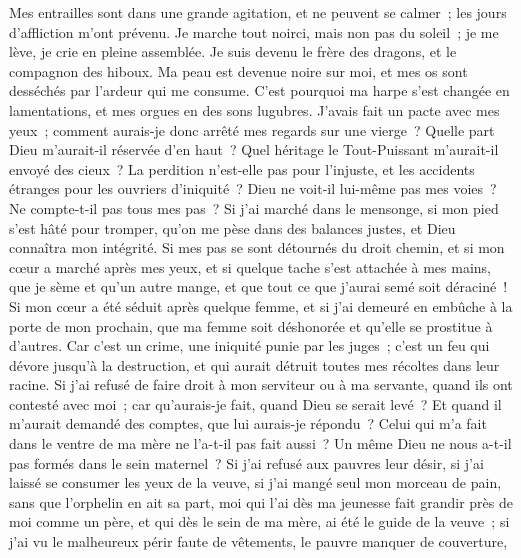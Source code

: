 \begin{multicols}{2}
Mes entrailles sont dans une grande agitation, et ne peuvent se calmer~; les jours d'affliction m'ont prévenu. 
Je marche tout noirci, mais non pas du soleil~; je me lève, je crie en pleine assemblée. 
Je suis devenu le frère des dragons, et le compagnon des hiboux.
Ma peau est devenue noire sur moi, et mes os sont desséchés par l'ardeur qui me consume.
C'est pourquoi ma harpe s'est changée en lamentations, et mes orgues en des sons lugubres.
\VerseOne{}J'avais fait un pacte avec mes yeux~; comment aurais-je donc arrêté mes regards sur une vierge~? 
Quelle part Dieu m'aurait-il réservée d'en haut~? Quel héritage le Tout-Puissant m'aurait-il envoyé des cieux~?
La perdition n'est-elle pas pour l'injuste, et les accidents étranges pour les ouvriers d'iniquité~?
Dieu ne voit-il lui-même pas mes voies~? Ne compte-t-il pas tous mes pas~?
Si j'ai marché dans le mensonge, si mon pied s'est hâté pour tromper,
qu'on me pèse dans des balances justes, et Dieu connaîtra mon intégrité.
Si mes pas se sont détournés du droit chemin, et si mon cœur a marché après mes yeux, et si quelque tache s'est attachée à mes mains,
que je sème et qu'un autre mange, et que tout ce que j'aurai semé soit déraciné~!
Si mon cœur a été séduit après quelque femme, et si j'ai demeuré en embûche à la porte de mon prochain,
que ma femme soit déshonorée et qu'elle se prostitue à d'autres.
Car c'est un crime, une iniquité punie par les juges~;
c'est un feu qui dévore jusqu'à la destruction, et qui aurait détruit toutes mes récoltes dans leur racine.
Si j'ai refusé de faire droit à mon serviteur ou à ma servante, quand ils ont contesté avec moi~;
car qu'aurais-je fait, quand Dieu se serait levé~? Et quand il m'aurait demandé des comptes, que lui aurais-je répondu~?
Celui qui m'a fait dans le ventre de ma mère ne l'a-t-il pas fait aussi~? Un même Dieu ne nous a-t-il pas formés dans le sein maternel~?
Si j'ai refusé aux pauvres leur désir, si j'ai laissé se consumer les yeux de la veuve,
si j'ai mangé seul mon morceau de pain, sans que l'orphelin en ait sa part,
moi qui l'ai dès ma jeunesse fait grandir près de moi comme un père, et qui dès le sein de ma mère, ai été le guide de la veuve~;
si j'ai vu le malheureux périr faute de vêtements, le pauvre manquer de couverture,

\end{multicols}
